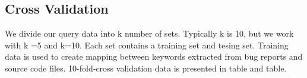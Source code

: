 \documentclass[conference]{IEEEtran}
\begin{document}
\subsection{Cross Validation}
We divide our query data into k number of sets. Typically k is 10, but we work with k =5 and k=10. Each set contains a training set and tesing set. Training data is used to create mapping between keywords extracted from bug reports and source code files. 10-fold-cross validation data is presented in table and table.


\begin{table}[htbp]
\centering
\caption{Performance of proposed technique (VSM+Co-Occerence) Ranks}
\label{tab:T3}
\end{table}
\end{document}
